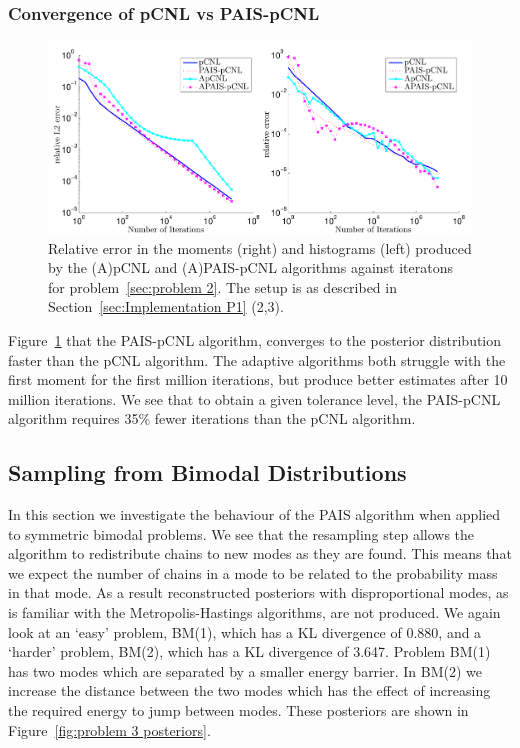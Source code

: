 \documentclass[final]{siamltex}
\begin{document}
\subsubsection{Convergence of pCNL vs PAIS-pCNL}

\begin{figure}[htpb]
\begin{center}
\includegraphics[width=\textwidth]{"figures/pCNL2_error"}
\caption{Relative error in the moments (right) and histograms (left) produced by the (A)pCNL and (A)PAIS-pCNL algorithms against iteratons for problem~\ref{sec:problem 2}. The setup is as described in Section~\ref{sec:Implementation P1} (2,3).}
\label{fig:MH2 L2}
\end{center}
\end{figure}

Figure~\ref{fig:MH2 L2} that the PAIS-pCNL algorithm, converges to the posterior distribution faster than the pCNL algorithm. The adaptive algorithms both struggle with the first moment for the first million iterations, but produce better estimates after 10 million iterations. We see that to obtain a given tolerance level, the PAIS-pCNL algorithm requires 35\% fewer iterations than the pCNL algorithm.

\subsection{Sampling from Bimodal Distributions}

In this section we investigate the behaviour of the PAIS algorithm when applied to symmetric bimodal problems. We see that the resampling step allows the algorithm to redistribute chains to new modes as they are found. This means that we expect the number of chains in a mode to be related to the probability mass in that mode. As a result reconstructed posteriors with disproportional modes, as is familiar with the Metropolis-Hastings algorithms, are not produced. We again look at an `easy' problem, BM(1), which has a KL divergence of 0.880, and a `harder' problem, BM(2), which has a KL divergence of 3.647. Problem BM(1) has two modes which are separated by a smaller energy barrier. In BM(2) we increase the distance between the two modes which has the effect of increasing the required energy to jump between modes. These posteriors are shown in Figure~\ref{fig:problem 3 posteriors}.
\end{document}
